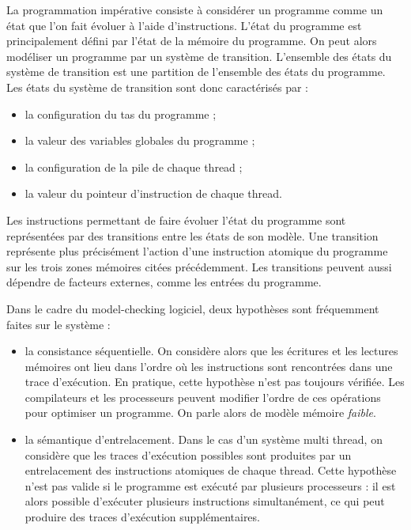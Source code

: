 La programmation impérative consiste à considérer un programme comme un état que
l'on fait évoluer à l'aide d'instructions. L'état du programme est
principalement défini par l'état de la mémoire du programme.
On peut alors modéliser un programme par un système de transition. L'ensemble
des états du système de transition est une partition de l'ensemble des états du
programme. Les états du système de transition sont donc caractérisés par :

\begin{itemize}
\item
  la configuration du tas du programme ;
\item
  la valeur des variables globales du programme ;
\item
  la configuration de la pile de chaque thread ;
\item
  la valeur du pointeur d'instruction de chaque thread.
\end{itemize}

Les instructions permettant de faire évoluer l'état du programme sont
représentées par des transitions entre les états de son modèle. Une transition
représente plus précisément l'action d'une instruction atomique du programme sur
les trois zones mémoires citées précédemment. Les transitions peuvent aussi
dépendre de facteurs externes, comme les entrées du programme.

Dans le cadre du model-checking logiciel, deux hypothèses sont fréquemment
faites sur le système :

\begin{itemize}
\item
  la consistance séquentielle. On considère alors que les écritures et
  les lectures mémoires ont lieu dans l'ordre où les instructions sont
  rencontrées dans une trace d'exécution. En pratique, cette hypothèse
  n'est pas toujours vérifiée. Les compilateurs et les processeurs
  peuvent modifier l'ordre de ces opérations pour optimiser un
  programme. On parle alors de modèle mémoire \emph{faible}.
\item
  la sémantique d'entrelacement. Dans le cas d'un système multi thread,
  on considère que les traces d'exécution possibles sont produites par
  un entrelacement des instructions atomiques de chaque thread. Cette
  hypothèse n'est pas valide si le programme est exécuté par plusieurs
  processeurs : il est alors possible d'exécuter plusieurs instructions
  simultanément, ce qui peut produire des traces d'exécution
  supplémentaires.
\end{itemize}

